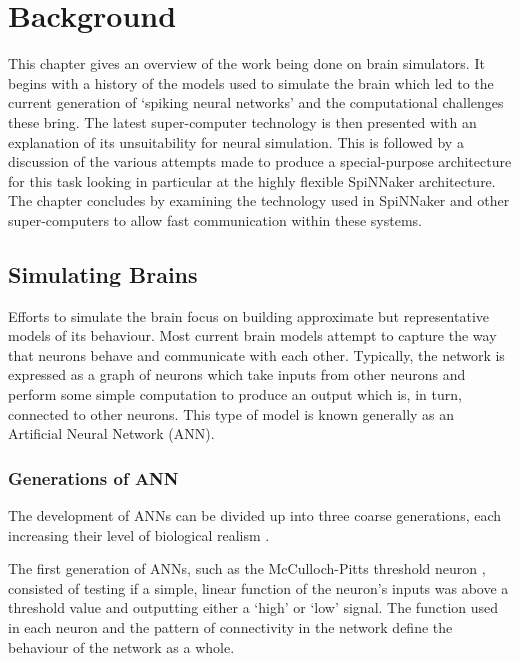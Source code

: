 \chapter{Background}
	\label{chap:background}
	
	This chapter gives an overview of the work being done on brain simulators. It
	begins with a history of the models used to simulate the brain which led to
	the current generation of `spiking neural networks' and the computational
	challenges these bring. The latest super-computer technology is then presented
	with an explanation of its unsuitability for neural simulation. This is
	followed by a discussion of the various attempts made to produce a
	special-purpose architecture for this task looking in particular at the highly
	flexible SpiNNaker architecture. The chapter concludes by examining the
	technology used in SpiNNaker and other super-computers to allow fast
	communication within these systems.
	
	\section{Simulating Brains}
		
		\label{sec:simulating-brains}
		
		Efforts to simulate the brain focus on building approximate but
		representative models of its behaviour. Most current brain models attempt to
		capture the way that neurons behave and communicate with each other.
		Typically, the network is expressed as a graph of neurons which take inputs
		from other neurons and perform some simple computation to produce an output
		which is, in turn, connected to other neurons. This type of model is known
		generally as an Artificial Neural Network (ANN).
		
		\subsection{Generations of ANN}
			
			The development of ANNs can be divided up into three coarse generations,
			each increasing their level of biological realism \cite{vainbrand11}.
			
			The first generation of ANNs, such as the McCulloch-Pitts threshold neuron
			\cite{mcculloch43}, consisted of testing if a simple, linear function of
			the neuron's inputs was above a threshold value and outputting either a
			`high' or `low' signal. The function used in each neuron and the pattern
			of connectivity in the network define the behaviour of the network as a
			whole.
			
